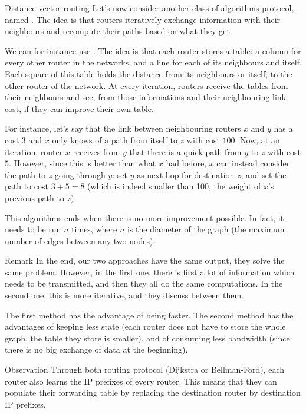 \documentclass[a4paper]{article}
\begin{document}
\begin{parag}{Distance-vector routing}
    Let's now consider another class of algorithms protocol, named . The idea is that routers iteratively exchange information with their neighbours and recompute their paths based on what they get.

    We can for instance use . The idea is that each router stores a table: a column for every other router in the networks, and a line for each of its neighbours and itself. Each square of this table holds the distance from its neighbours or itself, to the other router of the network. At every iteration, routers receive the tables from their neighbours and see, from those informations and their neighbouring link cost, if they can improve their own table.

    For instance, let's say that the link between neighbouring routers $x$ and $y$ has a cost $3$ and $x$ only knows of a path from itself to $z$ with cost $100$. Now, at an iteration, router $x$ receives from $y$ that there is a quick path from $y$ to $z$ with cost $5$. However, since this is better than what $x$ had before, $x$ can instead consider the path to $z$ going through $y$: set $y$ as next hop for destination $z$, and set the path to cost $3 + 5 = 8$ (which is indeed smaller than 100, the weight of $x$'s previous path to $z$).

    This algorithms ends when there is no more improvement possible. In fact, it needs to be run $n$ times, where $n$ is the diameter of the graph (the maximum number of edges between any two nodes).
\end{parag}

\begin{parag}{Remark}
    In the end, our two approaches have the same output, they solve the same problem. However, in the first one, there is first a lot of information which needs to be transmitted, and then they all do the same computations. In the second one, this is more iterative, and they discuss between them.

    The first method has the advantage of being faster. The second method has the advantages of keeping less state (each router does not have to store the whole graph, the table they store is smaller), and of consuming less bandwidth (since there is no big exchange of data at the beginning).
\end{parag}


\begin{parag}{Observation}
    Through both routing protocol (Dijkstra or Bellman-Ford), each router also learns the IP prefixes of every router. This means that they can populate their forwarding table by replacing the destination router by destination IP prefixes.
\end{parag}
\end{document}
